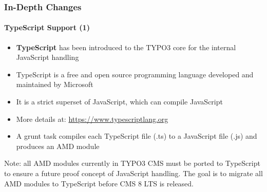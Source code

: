 \begin{frame}[fragile]
	\frametitle{In-Depth Changes}
	\framesubtitle{TypeScript Support (1)}

	\begin{itemize}
		\item \textbf{TypeScript} has been introduced to the TYPO3 core for the internal JavaScript handling
		\item TypeScript is a free and open source programming language developed and maintained by Microsoft
		\item It is a strict superset of JavaScript, which can compile JavaScript
		\item More details at: \url{https://www.typescriptlang.org}
		\item A grunt task compiles each TypeScript file (.ts) to a JavaScript file (.js) and produces an AMD module
	\end{itemize}

	\small
		Note: all AMD modules currently in TYPO3 CMS must be ported to TypeScript to ensure a future proof concept of JavaScript handling.
		The goal is to migrate all AMD modules to TypeScript before CMS 8 LTS is released.
	\normalsize

\end{frame}


